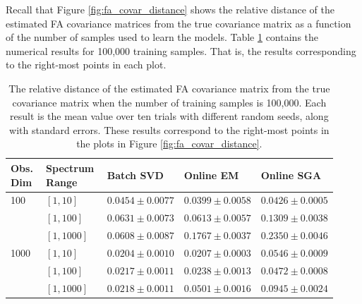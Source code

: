 \documentclass[msc,deptreport.inf]{infthesis} %
\begin{document}
Recall that Figure \ref{fig:fa_covar_distance} shows the relative distance of the estimated FA covariance matrices from the true covariance matrix as a function of the number of samples used to learn the models. Table \ref{table:fa_covar_distance} contains the numerical results for 100,000 training samples. That is, the results corresponding to the right-most points in each plot.
\begin{table}[h!]
	\begin{center}
		\begin{tabular}{|| p{0.12\linewidth} p{0.20\linewidth} p{0.20\linewidth} p{0.20\linewidth} p{0.20\linewidth} ||} 
 			\hline
 			Obs. Dim & Spectrum Range & Batch SVD & Online EM & Online SGA \\ [0.5ex] 
 			\hline\hline
			100 	& $[1, 10]$ 	& $0.0454 \pm 0.0077$ 	& $0.0399 \pm 0.0058$	& $0.0426 \pm 0.0005$ \\ 
				& $[1, 100]$ 	& $0.0631 \pm 0.0073$ 	& $0.0613 \pm 0.0057$ 	& $0.1309 \pm 0.0038$ \\ 
				& $[1, 1000]$	& $0.0608 \pm 0.0087$ 	& $0.1767 \pm 0.0037$ 	& $0.2350 \pm 0.0046$ \\ 
			\hline
			1000	& $[1, 10]$ 	& $0.0204 \pm 0.0010$ 	& $0.0207 \pm 0.0003$ 	& $0.0546 \pm 0.0009$ \\ 
				& $[1, 100]$ 	& $0.0217 \pm 0.0011$ 	& $0.0238 \pm 0.0013$ 	& $0.0472 \pm 0.0008$ \\ 
				& $[1, 1000]$ 	& $0.0218 \pm 0.0011$ 	& $0.0501 \pm 0.0016$ 	& $0.0945 \pm 0.0024$ \\ [1ex] 
			\hline
		\end{tabular}
		\caption{The relative distance of the estimated FA covariance matrix from the true covariance matrix when 
		the number of training samples is 100,000. Each result is the mean value over ten trials with different random seeds, along with standard errors. These results correspond to the right-most points in the plots in Figure \ref{fig:fa_covar_distance}.}
		\label{table:fa_covar_distance}
	\end{center}
\end{table}
\end{document}
